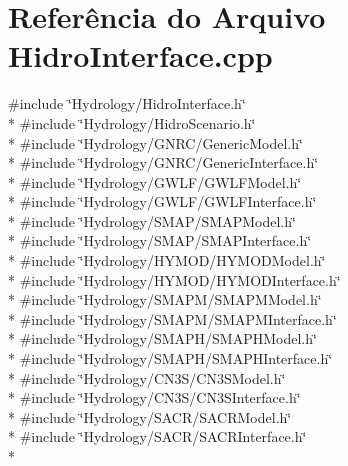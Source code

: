 \section{Referência do Arquivo Hidro\+Interface.\+cpp}
\label{_hidro_interface_8cpp}
{\ttfamily \#include \char`\"{}Hydrology/\+Hidro\+Interface.\+h\char`\"{}}\\*
{\ttfamily \#include \char`\"{}Hydrology/\+Hidro\+Scenario.\+h\char`\"{}}\\*
{\ttfamily \#include \char`\"{}Hydrology/\+G\+N\+R\+C/\+Generic\+Model.\+h\char`\"{}}\\*
{\ttfamily \#include \char`\"{}Hydrology/\+G\+N\+R\+C/\+Generic\+Interface.\+h\char`\"{}}\\*
{\ttfamily \#include \char`\"{}Hydrology/\+G\+W\+L\+F/\+G\+W\+L\+F\+Model.\+h\char`\"{}}\\*
{\ttfamily \#include \char`\"{}Hydrology/\+G\+W\+L\+F/\+G\+W\+L\+F\+Interface.\+h\char`\"{}}\\*
{\ttfamily \#include \char`\"{}Hydrology/\+S\+M\+A\+P/\+S\+M\+A\+P\+Model.\+h\char`\"{}}\\*
{\ttfamily \#include \char`\"{}Hydrology/\+S\+M\+A\+P/\+S\+M\+A\+P\+Interface.\+h\char`\"{}}\\*
{\ttfamily \#include \char`\"{}Hydrology/\+H\+Y\+M\+O\+D/\+H\+Y\+M\+O\+D\+Model.\+h\char`\"{}}\\*
{\ttfamily \#include \char`\"{}Hydrology/\+H\+Y\+M\+O\+D/\+H\+Y\+M\+O\+D\+Interface.\+h\char`\"{}}\\*
{\ttfamily \#include \char`\"{}Hydrology/\+S\+M\+A\+P\+M/\+S\+M\+A\+P\+M\+Model.\+h\char`\"{}}\\*
{\ttfamily \#include \char`\"{}Hydrology/\+S\+M\+A\+P\+M/\+S\+M\+A\+P\+M\+Interface.\+h\char`\"{}}\\*
{\ttfamily \#include \char`\"{}Hydrology/\+S\+M\+A\+P\+H/\+S\+M\+A\+P\+H\+Model.\+h\char`\"{}}\\*
{\ttfamily \#include \char`\"{}Hydrology/\+S\+M\+A\+P\+H/\+S\+M\+A\+P\+H\+Interface.\+h\char`\"{}}\\*
{\ttfamily \#include \char`\"{}Hydrology/\+C\+N3\+S/\+C\+N3\+S\+Model.\+h\char`\"{}}\\*
{\ttfamily \#include \char`\"{}Hydrology/\+C\+N3\+S/\+C\+N3\+S\+Interface.\+h\char`\"{}}\\*
{\ttfamily \#include \char`\"{}Hydrology/\+S\+A\+C\+R/\+S\+A\+C\+R\+Model.\+h\char`\"{}}\\*
{\ttfamily \#include \char`\"{}Hydrology/\+S\+A\+C\+R/\+S\+A\+C\+R\+Interface.\+h\char`\"{}}\\*
